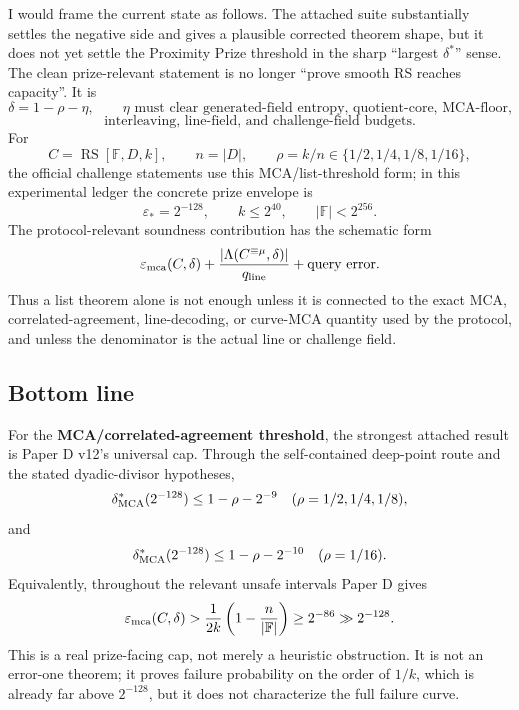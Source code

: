 \documentclass[11pt]{article}
\newcommand{\F}{\mathbb F}
\newcommand{\RS}{\operatorname{RS}}
\newcommand{\qline}{q_{\rm line}}
\newcommand{\epsstar}{\varepsilon_*}
\newcommand{\epsmca}{\varepsilon_{\rm mca}}
\newcommand{\Lam}{\Lambda}
\begin{document}
I would frame the current state as follows.  The attached suite substantially
settles the negative side and gives a plausible corrected theorem shape, but it
does not yet settle the Proximity Prize threshold in the sharp ``largest
\(\delta^*\)'' sense.  The clean prize-relevant statement is no longer
``prove smooth RS reaches capacity''.  It is
\[
  \delta=1-\rho-\eta,
  \qquad
  \eta\text{ must clear generated-field entropy, quotient-core, MCA-floor,}
\]
\[
  \text{interleaving, line-field, and challenge-field budgets.}
\]
For
\[
  C=\RS[\F,D,k],\qquad n=|D|,
  \qquad \rho=k/n\in\{1/2,1/4,1/8,1/16\},
\]
the official challenge statements use this MCA/list-threshold form; in this
experimental ledger the concrete prize envelope is~\cite{ProximityPrize26}
\[
  \epsstar=2^{-128},\qquad k\le2^{40},\qquad |\F|<2^{256}.
\]
The protocol-relevant soundness contribution has the schematic form
\[
  \epsmca(C,\delta)
  +\frac{|\Lam(C^{\equiv\mu},\delta)|}{\qline}
  +\text{query error}.
\]
Thus a list theorem alone is not enough unless it is connected to the exact MCA,
correlated-agreement, line-decoding, or curve-MCA quantity used by the protocol,
and unless the denominator is the actual line or challenge field.

\subsection{Bottom line}

For the \textbf{MCA/correlated-agreement threshold}, the strongest attached
result is Paper D v12's universal cap.  Through the self-contained deep-point
route and the stated dyadic-divisor hypotheses,
\[
  \delta^*_{\rm MCA}(2^{-128})
  \le 1-\rho-2^{-9}
  \quad (\rho=1/2,1/4,1/8),
\]
and
\[
  \delta^*_{\rm MCA}(2^{-128})
  \le 1-\rho-2^{-10}
  \quad (\rho=1/16).
\]
Equivalently, throughout the relevant unsafe intervals Paper D gives
\[
  \epsmca(C,\delta)
  >\frac1{2k}\left(1-\frac n{|\F|}\right)
  \ge2^{-86}\gg2^{-128}.
\]
This is a real prize-facing cap, not merely a heuristic obstruction.  It is not
an error-one theorem; it proves failure probability on the order of \(1/k\),
which is already far above \(2^{-128}\), but it does not characterize the full
failure curve.
\end{document}
